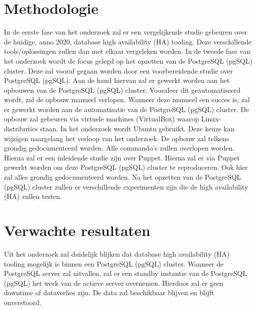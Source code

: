 \section{Methodologie}
\label{sec:methodologie}
In de eerste fase van het onderzoek zal er een vergelijkende studie gebeuren over de huidige, anno 2020, database high availability (HA) tooling. Deze verschillende tools/oplossingen zullen dan met elkaar vergeleken worden. In de tweede fase van het onderzoek wordt de focus gelegd op het opzetten van de PostgreSQL (pgSQL) cluster. Deze zal vooraf gegaan worden door een voorbereidende studie over PostgreSQL (pgSQL). Aan de hand hiervan zal er gewerkt worden aan het opbouwen van de PostgreSQL (pgSQL) cluster. Vooraleer dit geautomatiseerd wordt, zal de opbouw manueel verlopen. Wanneer deze manueel een succes is, zal er gewerkt worden aan de automatisatie van de PostgreSQL (pgSQL) cluster. De opbouw zal gebeuren via virtuele machines (VirtualBox) waarop Linux-distributies staan. In het onderzoek wordt Ubuntu gebruikt. Deze keuze kan wijzigen naargelang het verloop van het onderzoek. De opbouw zal telkens grondig gedocumenteerd worden. Alle commando's zullen overlopen worden. Hierna zal er een inleidende studie zijn over Puppet. Hierna zal er via Puppet gewerkt worden om deze PostgreSQL (pgSQL) cluster te reproduceren. Ook hier zal alles grondig gedocumenteerd worden.
Na het opzetten van de PostgreSQL (pgSQL) cluster zullen er verschillende experimenten zijn die de high availability (HA) zullen testen.





\section{Verwachte resultaten}
\label{sec:verwachte_resultaten}
Uit het onderzoek zal duidelijk blijken dat database high availability (HA) tooling mogelijk is binnen een PostgreSQL (pgSQL) cluster. Wanneer de PostgreSQL server zal uitvallen, zal er een standby instantie van de PostgreSQL (pgSQL) het werk van de actieve server overnemen. Hierdoor zal er geen downtime of dataverlies zijn. De data zal beschikbaar blijven en blijft onverstoord.

